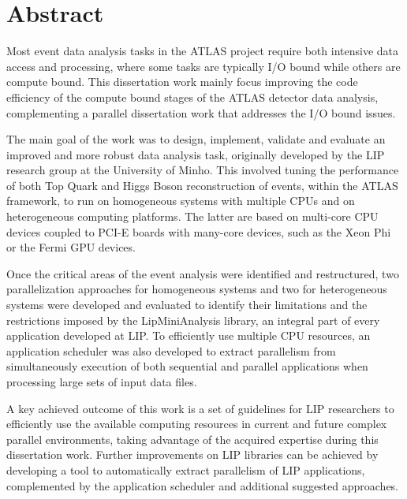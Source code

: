 \chapter*{Abstract}
\label{Abstract}

Most event data analysis tasks in the ATLAS project require both intensive data access and processing, where some tasks are typically I/O bound while others are compute bound. This dissertation work mainly focus improving the code efficiency of the compute bound stages of the ATLAS detector data analysis, complementing a parallel dissertation work that addresses the I/O bound issues.

The main goal of the work was to design, implement, validate and evaluate an improved and more robust data analysis task, originally developed by the LIP research group at the University of Minho. This involved tuning the performance of both Top Quark and Higgs Boson reconstruction of events, within the ATLAS framework, to run on homogeneous systems with multiple CPUs and on heterogeneous computing platforms. The latter are based on multi-core CPU devices coupled to PCI-E boards with many-core devices, such as the \intel Xeon Phi or the \nvidia Fermi GPU devices.

Once the critical areas of the event analysis were identified and restructured, two parallelization approaches for homogeneous systems and two for heterogeneous systems were developed and evaluated to identify their limitations and the restrictions imposed by the LipMiniAnalysis library, an integral part of every application developed at LIP. To efficiently use multiple CPU resources, an application scheduler was also developed to extract parallelism from simultaneously execution of both sequential and parallel applications when processing large sets of input data files.

A key achieved outcome of this work is a set of guidelines for LIP researchers to efficiently use the available computing resources in current and future complex parallel environments, taking advantage of the acquired expertise during this dissertation work. Further improvements on LIP libraries can be achieved by developing a tool to automatically extract parallelism of LIP applications, complemented by the application scheduler and additional suggested approaches.
